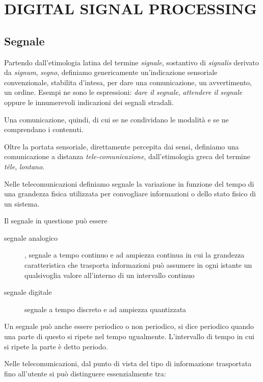 
\chapter{DIGITAL SIGNAL PROCESSING}

\section{Segnale}

Partendo dall'etimologia latina del termine \emph{signale}, sostantivo di
\emph{signalis} derivato da \emph{signum}, \emph{segno}, definiamo genericamente
un'indicazione sensoriale convenzionale, stabilita d'intesa, per dare una
comunicazione, un avvertimento, un ordine. Esempi ne sono le espressioni:
\emph{dare il segnale}, \emph{attendere il segnale} oppure le innumerevoli
indicazioni dei segnali stradali.

Una comunicazione, quindi, di cui se ne condividano le modalità e se ne
comprendano i contenuti.

Oltre la portata sensoriale, direttamente percepita dai sensi, definiamo
una comunicazione a distanza \emph{tele-comunicazione}, dall'etimologia greca
del termine \emph{têle}, \emph{lontano}.

Nelle telecomunicazioni definiamo segnale la variazione in funzione del tempo
di una grandezza fisica utilizzata per convogliare informazioni o dello stato
fisico di un sistema.

Il segnale in questione può essere

\begin{description}
  \item[segnale analogico], segnale a tempo continuo e ad ampiezza continua in
       cui la grandezza caratteristica che trasporta
       informazioni può assumere in ogni istante un qualsivoglia valore
       all'interno di un intervallo continuo
  \item[segnale digitale] segnale a tempo discreto e ad ampiezza quantizzata
\end{description}

Un segnale può anche essere periodico o non periodico, si dice periodico quando
una parte di questo si ripete nel tempo ugualmente. L'intervallo di tempo in cui
si ripete la parte è detto periodo.

Nelle telecomunicazioni, dal punto di vista del tipo di informazione trasportata
fino all'utente si può distinguere essenzialmente tra:

